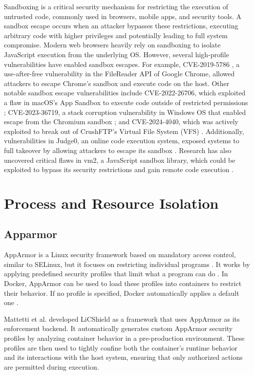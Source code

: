 \documentclass[12pt]{report}
\begin{document}
\begin{doublespace}
Sandboxing is a critical security mechanism for restricting the execution of untrusted code, commonly used in browsers, mobile apps, and security tools. A sandbox escape occurs when an attacker bypasses these restrictions, executing arbitrary code with higher privileges and potentially leading to full system compromise. Modern web browsers heavily rely on sandboxing to isolate JavaScript execution from the underlying OS. However, several high-profile vulnerabilities have enabled sandbox escapes. For example, CVE-2019-5786 \cite{chromezeroday}, a use-after-free vulnerability in the FileReader API of Google Chrome, allowed attackers to escape Chrome's sandbox and execute code on the host. Other notable sandbox escape vulnerabilities include CVE-2022-26706, which exploited a flaw in macOS's App Sandbox to execute code outside of restricted permissions \cite{macossandboxescape}; CVE-2023-36719, a stack corruption vulnerability in Windows OS that enabled escape from the Chromium sandbox \cite{chromiumsandboxescape}; and CVE-2024-4040, which was actively exploited to break out of CrushFTP’s Virtual File System (VFS) \cite{crushftpsandboxescape}. Additionally, vulnerabilities in Judge0, an online code execution system, exposed systems to full takeover by allowing attackers to escape its sandbox \cite{judge0sandboxescape}. Research has also uncovered critical flaws in vm2, a JavaScript sandbox library, which could be exploited to bypass its security restrictions and gain remote code execution \cite{vm2sandboxescape}.

\section{Process and Resource Isolation}

\subsection{Apparmor}

AppArmor is a Linux security framework based on mandatory access control, similar to SELinux, but it focuses on restricting individual programs \cite{zhu2021lic}. It works by applying predefined security profiles that limit what a program can do \cite{zhu2021lic}. In Docker, AppArmor can be used to load these profiles into containers to restrict their behavior. If no profile is specified, Docker automatically applies a default one \cite{zhu2021lic}.

Mattetti et al. \cite{mattetti2015securing} developed LiCShield as a framework that uses AppArmor as its enforcement backend. It automatically generates custom AppArmor security profiles by analyzing container behavior in a pre-production environment. These profiles are then used to tightly confine both the container’s runtime behavior and its interactions with the host system, ensuring that only authorized actions are permitted during execution.


\end{doublespace}
\end{document}
